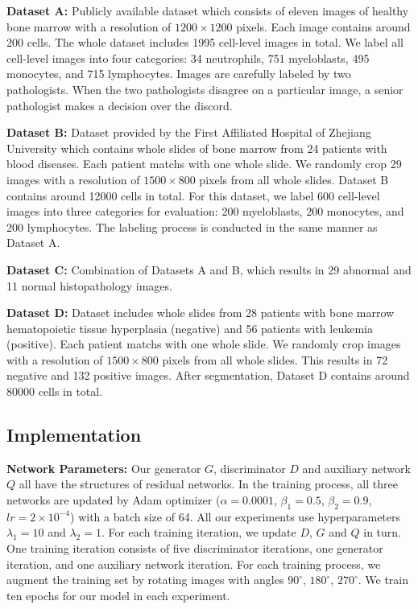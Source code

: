 \documentclass[journal]{IEEEtran}
\begin{document}
\textbf{Dataset A:} Publicly available dataset \cite{kainz2015you} which consists of eleven images of healthy bone marrow with a resolution of $1200 \times 1200$ pixels. Each image contains around 200 cells. The whole dataset includes 1995 cell-level images in total. We label all cell-level images into four categories: 34 neutrophils, 751 myeloblasts, 495 monocytes, and 715 lymphocytes. Images are carefully labeled by two pathologists. When the two pathologists disagree on a particular image, a senior pathologist makes a decision over the discord.

\textbf{Dataset B:} Dataset provided by the First Affiliated Hospital of Zhejiang University which contains whole slides of bone marrow from 24 patients with blood diseases. Each patient matchs with one whole slide. We randomly crop 29 images with a resolution of $1500 \times 800$ pixels from all whole slides. Dataset B contains around 12000 cells in total. For this dataset, we label 600 cell-level images into three categories for evaluation: 200 myeloblasts, 200 monocytes, and 200 lymphocytes. The labeling process is conducted in the same manner as Dataset A.

\textbf{Dataset C:} Combination of Datasets A and B, which results in 29 abnormal and 11 normal histopathology images. 

\textbf{Dataset D:} Dataset includes whole slides from 28 patients with bone marrow hematopoietic tissue hyperplasia (negative) and 56 patients with leukemia (positive). Each patient matchs with one whole slide. We randomly crop images with a resolution of $1500 \times 800$ pixels from all whole slides. This results in 72 negative and 132 positive images. After segmentation, Dataset D contains around 80000 cells in total.
\subsection{Implementation}

\textbf{Network Parameters:} Our generator $G$, discriminator $D$ and auxiliary network $Q$ all have the structures of residual networks. In the training process, all three networks are updated by Adam optimizer ($\alpha=0.0001$, $\beta_1=0.5$, $\beta_2=0.9$, $lr=2 \times 10^{-4}$) \cite{kingma2014adam} with a batch size of 64. All our experiments use hyperparameters $\lambda_1 = 10$ and $\lambda _2 = 1$. For each training iteration, we update $D$, $G$ and $Q$ in turn. One training iteration consists of five discriminator iterations, one generator iteration, and one auxiliary network iteration. For each training process, we augment the training set by rotating images with angles $90^\circ$, $180^\circ$, $270^\circ$. We train ten epochs for our model in each experiment.
\end{document}

